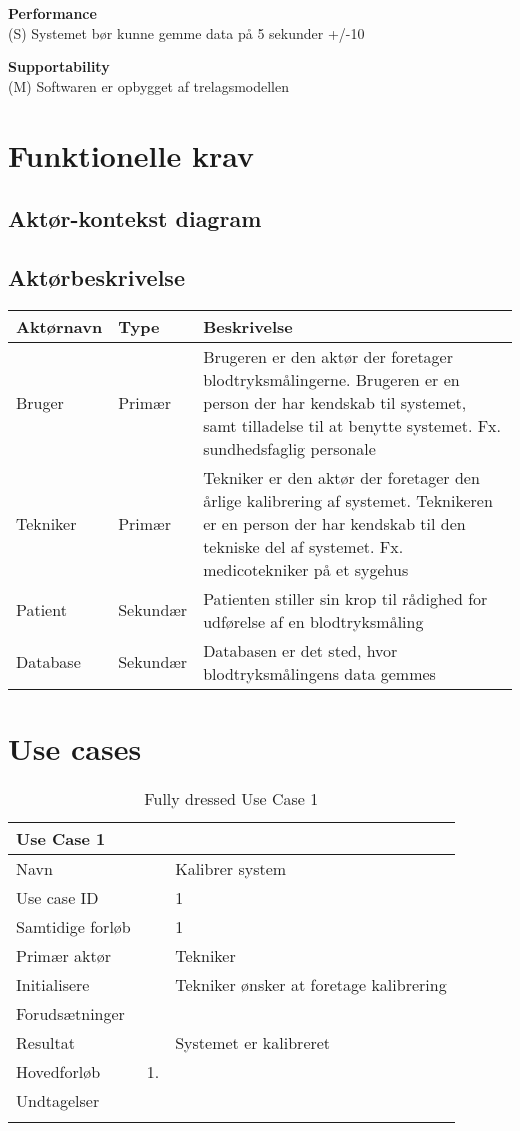 \textbf{Performance}\\
(S) Systemet bør kunne gemme data på 5 sekunder +/-10%

\textbf{Supportability}\\
(M) Softwaren er opbygget af trelagsmodellen\\


\section{Funktionelle krav}
\subsection{Aktør-kontekst diagram}
\subsection{Aktørbeskrivelse}
\begin{longtabu}to 
	{\large \textbf{Aktørnavn}} & {\large \textbf{Type}} & {\large \textbf{Beskrivelse}}\\ \toprule
	Bruger & Primær & Brugeren er den aktør der foretager blodtryksmålingerne. Brugeren er en person der har kendskab til systemet, samt tilladelse til at benytte systemet. Fx. sundhedsfaglig personale \\
	Tekniker & Primær & Tekniker er den aktør der foretager den årlige kalibrering af systemet. Teknikeren er en person der har kendskab til den tekniske del af systemet. Fx. medicotekniker på et sygehus\\
	Patient & Sekundær & Patienten stiller sin krop til rådighed for udførelse af en blodtryksmåling\\
	Database & Sekundær & Databasen er det sted, hvor blodtryksmålingens data gemmes
	
	
\end{longtabu}

\section{Use cases}

\begin{longtabu} to  %
    {\large \textbf{Use Case 1}} && \\
    \toprule
    Navn &&    Kalibrer system\\
    Use case ID &&    1\\
    Samtidige forløb &&    1\\
    Primær aktør &&    Tekniker\\
    Initialisere &&    Tekniker ønsker at foretage kalibrering\\
    Forudsætninger &&  \\
    Resultat &&    Systemet er kalibreret                     \\ \midrule
    Hovedforløb &    1. &      \\ \midrule
                
    Undtagelser &    &    \\ \bottomrule
\caption{Fully dressed Use Case 1}
\label{UC1}
\end{longtabu}

